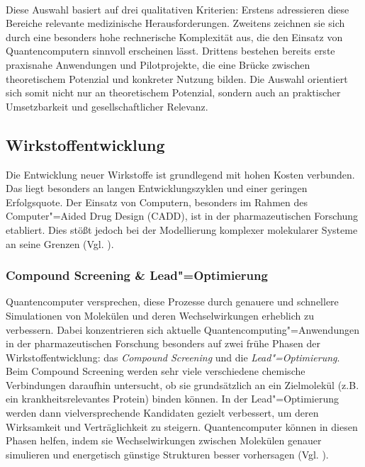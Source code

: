 \\
Diese Auswahl basiert auf drei qualitativen Kriterien: Erstens adressieren diese Bereiche relevante medizinische Herausforderungen. Zweitens zeichnen sie sich durch eine besonders hohe rechnerische Komplexität aus, die den Einsatz von Quantencomputern sinnvoll erscheinen lässt. Drittens bestehen bereits erste praxisnahe Anwendungen und Pilotprojekte, die eine Brücke zwischen theoretischem Potenzial und konkreter Nutzung bilden. Die Auswahl orientiert sich somit nicht nur an theoretischem Potenzial, sondern auch an praktischer Umsetzbarkeit und gesellschaftlicher Relevanz.

\subsection{Wirkstoffentwicklung}
Die Entwicklung neuer Wirkstoffe ist grundlegend mit hohen Kosten verbunden. Das liegt besonders an langen Entwicklungszyklen und einer geringen Erfolgsquote. Der Einsatz von Computern, besonders im Rahmen des Computer"=Aided Drug Design (CADD), ist in der pharmazeutischen Forschung etabliert. Dies stößt jedoch bei der Modellierung komplexer molekularer Systeme an seine Grenzen (Vgl. \cite{bertl_quantum_2025}).

\subsubsection*{Compound Screening \& Lead"=Optimierung}
Quantencomputer versprechen, diese Prozesse durch genauere und schnellere Simulationen von Molekülen und deren Wechselwirkungen erheblich zu verbessern. Dabei konzentrieren sich aktuelle Quantencomputing"=Anwendungen in der pharmazeutischen Forschung besonders auf zwei frühe Phasen der Wirkstoffentwicklung: das \textit{Compound Screening} und die \textit{Lead"=Optimierung}. Beim Compound Screening werden sehr viele verschiedene chemische Verbindungen daraufhin untersucht, ob sie grundsätzlich an ein Zielmolekül (z.B. ein krankheitsrelevantes Protein) binden können. In der Lead"=Optimierung werden dann vielversprechende Kandidaten gezielt verbessert, um deren Wirksamkeit und Verträglichkeit zu steigern. Quantencomputer können in diesen Phasen helfen, indem sie Wechselwirkungen zwischen Molekülen genauer simulieren und energetisch günstige Strukturen besser vorhersagen (Vgl. \cite{zinner_quantum_2021}).

